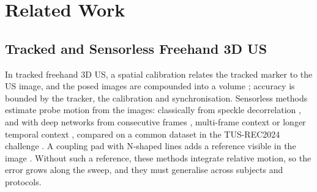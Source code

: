 \documentclass[journal]{IEEEtran}
\begin{document}
\section{Related Work}
\label{sec:related}

\subsection{Tracked and Sensorless Freehand 3D US}
In tracked freehand 3D US, a spatial calibration relates the tracked marker to the US image, and the posed images are compounded into a volume \cite{TODO-freehand-3dus-review}; accuracy is bounded by the tracker, the calibration and synchronisation. Sensorless methods estimate probe motion from the images: classically from speckle decorrelation \cite{TODO-speckle-decorrelation}, and with deep networks from consecutive frames \cite{prevost2018}, multi-frame context \cite{guo2023tbme} or longer temporal context \cite{li2024longterm}, compared on a common dataset in the TUS-REC2024 challenge \cite{li2025tusrec}. A coupling pad with N-shaped lines adds a reference visible in the image \cite{dai2024coupling}. Without such a reference, these methods integrate relative motion, so the error grows along the sweep, and they must generalise across subjects and protocols.
\end{document}
